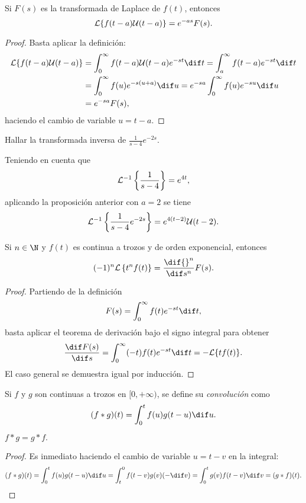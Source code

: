 \documentclass[../ecuaciones_diferenciales.tex]{subfiles}
\begin{document}
\begin{proposition}
	Si \(F(s)\) es la transformada de Laplace de \(f(t)\), entonces
	\[\mathcal{L}\{f(t-a)\mathcal{U}(t-a)\} = e^{-as}F(s).\]
	\begin{proof}
		Basta aplicar la definición:
		\begin{align*}
			\L\{f(t-a)\mathcal{U}(t-a)\}
			 & = \int_0^\infty f(t-a)\mathcal{U}(t-a) e^{-st} \dif t
			= \int_a^\infty f(t-a)e^{-st} \dif t                     \\
			 & = \int_0^\infty f(u)e^{-s(u+a)} \dif u
			= e^{-sa} \int_0^\infty f(u) e^{-su} \dif u              \\
			 & = e^{-sa}F(s),
		\end{align*}
		haciendo el cambio de variable \(u = t - a\).
	\end{proof}
\end{proposition}

\begin{example}
	Hallar la transformada inversa de \(\frac{1}{s-4}e^{-2s}\).
\end{example}

\begin{solution}
	Teniendo en cuenta que
	\[\mathcal{L}^{-1}\left\{\frac{1}{s-4}\right\} = e^{4t},\]
	aplicando la proposición anterior con \(a=2\) se tiene
	\[\mathcal{L}^{-1}\left\{\frac{1}{s-4}e^{-2s}\right\} = e^{4(t-2)}\mathcal{U}(t-2).\]
\end{solution}

\begin{theorem}
	Si \(n \in \N\) y \(f(t)\) es continua a trozos y de orden exponencial, entonces
	\[(-1)^n\L\left\{t^nf(t)\right\} = \frac{\dif {}^n}{\dif s^n} F(s).\]
	\begin{proof}
		Partiendo de la definición
		\[F(s) = \int_0^\infty f(t)e^{-st} \dif t,\]
		basta aplicar el teorema de derivación bajo el signo integral para obtener
		\[\frac{\dif F(s)}{\dif s} = \int_0^\infty (-t)f(t)e^{-st} \dif t =
			-\L\{tf(t)\}.\]
		El caso general se demuestra igual por inducción.
	\end{proof}
\end{theorem}

\begin{definition}
	Si \(f\) y \(g\) son continuas a trozos en \([0,+\infty)\), se define su
	\emph{convolución} como
	\[(f \ast g)(t) = \int_0^t f(u) g(t-u) \dif u.\]
\end{definition}

\begin{remark}
	\(f \ast g = g \ast f.\)
	\begin{proof}
		Es inmediato haciendo el cambio de variable \(u = t-v\) en la integral:
		\[(f \ast g)(t) = \int_0^t f(u) g(t-u) \dif u = \int_t^0 f(t-v)g(v)
			(-\dif v) = \int_0^t g(v) f(t-v) \dif v = (g \ast f)(t).\]
	\end{proof}
\end{remark}
\end{document}
